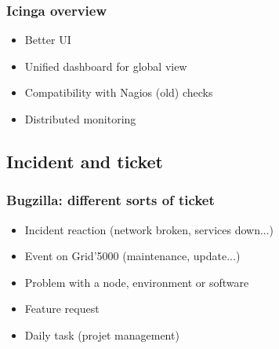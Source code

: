\documentclass[11pt,compress]{beamer}
\begin{document}
\begin{frame}
\frametitle{Icinga overview}
\begin{itemize}
\item Better UI
\item Unified dashboard for global view
\item Compatibility with Nagios (old) checks
\item Distributed monitoring
\end{itemize}
\end{frame}

\subsection{Incident and ticket}
\begin{frame}
\frametitle{Bugzilla: different sorts of ticket}
\begin{itemize}
\item Incident reaction (network broken, services down...)
\item Event on Grid'5000 (maintenance, update...)
\item Problem with a node, environment or software
\item Feature request
\item Daily task (projet management)
\end{itemize}
\end{frame}
\end{document}
